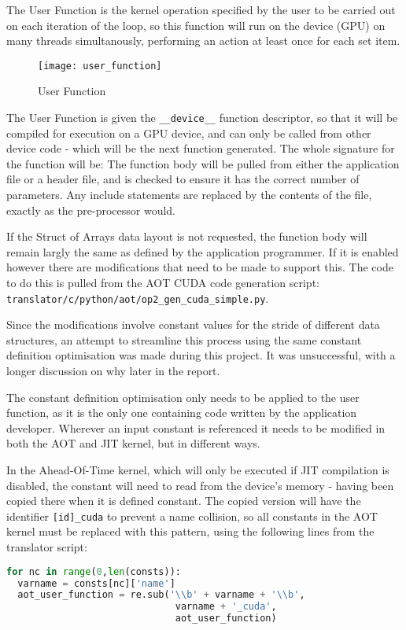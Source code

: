 The User Function is the kernel operation specified by the user to be carried out on each iteration of the loop, so this function will run on the device (GPU) on many threads simultanously, performing an action at least once for each set item.

\begin{wrapfigure}[12]{r}{.33\textwidth}
  \centering
  \caption{User Function}
  \label{fig:usr_func}
  \texttt{[image: user\_function]}
\end{wrapfigure}
The User Function is given the \verb|__device__| function  descriptor, so that it will be compiled for execution on a GPU device, and can only be called from other device code - which will be the next function generated. The whole signature for the function will be:
\noindent The function body will be pulled from either the application file or a header file, and is checked to ensure it has the correct number of parameters. Any include statements are replaced by the contents of the file, exactly as the pre-processor would.
\par
{} If the Struct of Arrays data layout is not requested, the function body will remain largly the same as defined by the application programmer. If it is enabled however there are modifications that need to be made to support this. The code to do this is pulled from the AOT CUDA code generation script: \\\verb|translator/c/python/aot/op2_gen_cuda_simple.py|.
\par
Since the modifications involve constant values for the stride of different data structures, an attempt to streamline this process using the same constant definition optimisation was made during this project. It was unsuccessful, with a longer discussion on why later in the report.
\par
{} The constant definition optimisation only needs to be applied to the user function, as it is the only one containing code written by the application developer. Wherever an input constant is referenced it needs to be modified in both the AOT and JIT kernel, but in different ways.

In the Ahead-Of-Time kernel, which will only be executed if JIT compilation is disabled, the constant will need to read from the device's memory - having been copied there when it is defined constant. The copied version will have the identifier \verb|[id]_cuda| to prevent a name collision, so all constants in the AOT kernel must be replaced with this pattern, using the following lines from the translator script:\\
\begin{lstlisting}[backgroundcolor = \color{lightgray!20}, language=Python]
for nc in range(0,len(consts)):
  varname = consts[nc]['name']
  aot_user_function = re.sub('\\b' + varname + '\\b',
                              varname + '_cuda',
                              aot_user_function)
\end{lstlisting}

